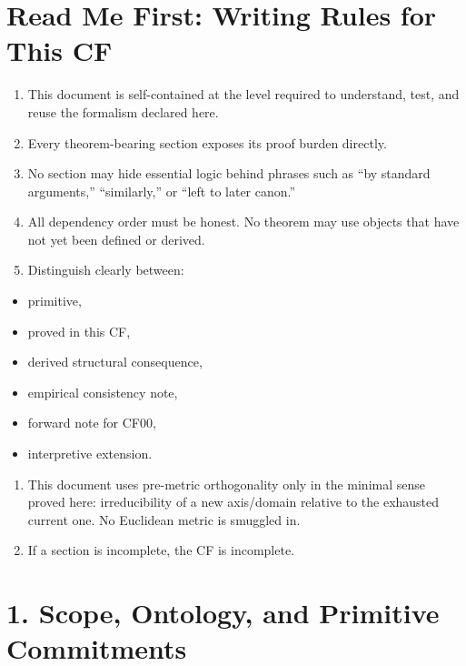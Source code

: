 \documentclass[11pt]{article}
\providecommand{\tightlist}{%
  \setlength{\itemsep}{1pt}\setlength{\parskip}{0pt}}
\begin{document}
\section{Read Me First: Writing Rules for This CF}\label{read-me-first-writing-rules-for-this-cf}

\begin{enumerate}
\def\labelenumi{\arabic{enumi}.}
\item
  This document is self-contained at the level required to understand, test, and reuse the formalism declared here.
\item
  Every theorem-bearing section exposes its proof burden directly.
\item
  No section may hide essential logic behind phrases such as ``by standard arguments,'' ``similarly,'' or ``left to later canon.''
\item
  All dependency order must be honest. No theorem may use objects that have not yet been defined or derived.
\item
  Distinguish clearly between:
\end{enumerate}

\begin{itemize}
\tightlist
\item
  primitive,
\item
  proved in this CF,
\item
  derived structural consequence,
\item
  empirical consistency note,
\item
  forward note for CF00,
\item
  interpretive extension.
\end{itemize}

\begin{enumerate}
\def\labelenumi{\arabic{enumi}.}
\setcounter{enumi}{5}
\item
  This document uses pre-metric orthogonality only in the minimal sense proved here: irreducibility of a new axis/domain relative to the exhausted current one. No Euclidean metric is smuggled in.
\item
  If a section is incomplete, the CF is incomplete.
\end{enumerate}

\section{1. Scope, Ontology, and Primitive Commitments}\label{scope-ontology-and-primitive-commitments}
\end{document}
